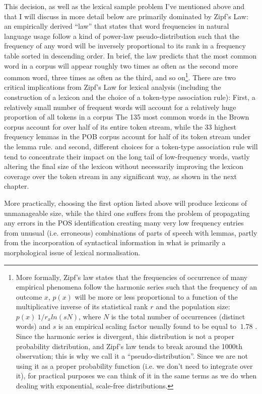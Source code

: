 This decision, as well as the lexical sample problem I've mentioned above and that I will discuss in more detail below are primarily dominated by Zipf's Law: an empirically derived ``law'' that states that word frequencies in natural language usage follow a kind of power-law pseudo-distribution such that the frequency of any word will be inversely proportional to its rank in a frequency table sorted in descending order.
In brief, the law predicts that the most common word in a corpus will appear roughly two times as often as the second more common word, three times as often as the third, and so on\footnote{
    More formally, Zipf's law states that the frequencies of occurrence of many empirical phenomena follow the harmonic series such that the frequency of an outcome $x$, $p(x)$ will be more or less proportional to a function of the multiplicative inverse of its statistical rank $r$ and the population size: $p(x) ~ 1 / r_x ln(sN)$, where $N$ is the total number of occurrences (distinct words) and $s$ is an empirical scaling factor usually found to be equal to $~1.78$ \citep{weisstein2016}.
    Since the harmonic series is divergent, this distribution is not a proper probability distribution, and Zipf's law tends to break around the 1000th observation; this is why we call it a ``pseudo-distribution''.
    Since we are not using it as a proper probability function (i.e. we don't need to integrate over it), for practical purposes we can think of it in the same terms as we do when dealing with exponential, scale-free distributions.
}.
There are two critical implications from Zipf's Law for lexical analysis (including the construction of a lexicon and the choice of a token-type association rule):
First, a relatively small number of frequent words will account for a relatively huge proportion of all tokens in a corpus{
    The 135 most common words in the Brown corpus account for over half of its entire token stream, while the 33 highest frequency lemmas in the POB corpus account for half of its token stream under the lemma rule.
} and second, different choices for a token-type association rule will tend to concentrate their impact on the long tail of low-frequency words, vastly altering the final size of the lexicon without necessarily improving the lexicon coverage over the token stream in any significant way, as shown in the next chapter.

More practically, choosing the first option listed above will produce lexicons of unmanageable size, while the third one suffers from the problem of propagating any errors in the POS identification creating many very low frequency entries from unusual (i.e. erroneous) combinations of parts of speech with lemmas, partly from the incorporation of syntactical information in what is primarily a morphological issue of lexical normalisation.

